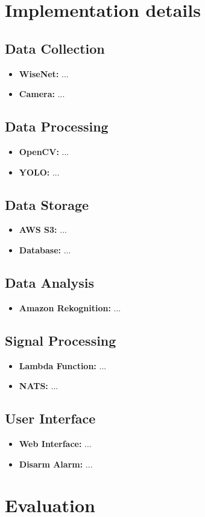 \documentclass[conference]{IEEEtran}
\begin{document}
\section{Implementation details}
\subsection{Data Collection}
\begin{itemize}
    \item \textbf{WiseNet:} ...
    \item \textbf{Camera:} ...
\end{itemize}
\subsection{Data Processing}
\begin{itemize}
    \item \textbf{OpenCV:} ...
    \item \textbf{YOLO:} ...
\end{itemize}
\subsection{Data Storage}
\begin{itemize}
    \item \textbf{AWS S3:} ...
    \item \textbf{Database:} ...
\end{itemize}
\subsection{Data Analysis}
\begin{itemize}
    \item \textbf{Amazon Rekognition:} ...
\end{itemize}
\subsection{Signal Processing}  
\begin{itemize}
    \item \textbf{Lambda Function:} ...
    \item \textbf{NATS:} ...
\end{itemize}
\subsection{User Interface}
\begin{itemize}
    \item \textbf{Web Interface:} ...
    \item \textbf{Disarm Alarm:} ...
\end{itemize}

\section{Evaluation}
\end{document}
